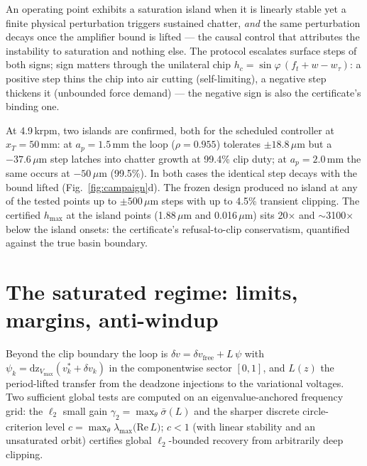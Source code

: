 \documentclass[preprint,12pt]{elsarticle}
\newcommand{\dz}{\mathrm{dz}}
\newcommand{\um}{\,\ensuremath{\mu\mathrm{m}}}
\begin{document}
An operating point exhibits a saturation island when it is linearly
stable yet a finite physical perturbation triggers sustained chatter,
\emph{and} the same perturbation decays once the amplifier bound is
lifted --- the causal control that attributes the instability to
saturation and nothing else. The protocol escalates surface steps of
both signs; sign matters through the unilateral chip
$h_c=\sin\varphi\,(f_t+w-w_\tau)$: a positive step thins the chip
into air cutting (self-limiting), a negative step thickens it
(unbounded force demand) --- the negative sign is also the
certificate's binding one.

At 4.9\,krpm, two islands are confirmed, both for the scheduled
controller at $x_T=50$\,mm: at $a_p=1.5$\,mm the loop
($\rho=0.955$) tolerates $\pm18.8\um$ but a $-37.6\um$ step latches
into chatter growth at 99.4\% clip duty; at $a_p=2.0$\,mm the same
occurs at $-50\um$ (99.5\%). In both cases the identical step decays
with the bound lifted (Fig.~\ref{fig:campaign}d). The frozen design
produced no island at any of the tested points up to $\pm500\um$
steps with up to 4.5\% transient clipping. The certified $h_{\max}$
at the island points (1.88\um{} and 0.016\um) sits 20$\times$ and
$\sim$3100$\times$ below the island onsets: the certificate's
refusal-to-clip conservatism, quantified against the true basin
boundary.

\section{The saturated regime: limits, margins, anti-windup}
\label{sec:satregime}

Beyond the clip boundary the loop is
$\delta v = \delta v_{\mathrm{free}} + L\,\psi$ with
$\psi_k=\dz_{V_{\max}}(v^*_k+\delta v_k)$ in the componentwise sector
$[0,1]$, and $L(z)$ the period-lifted transfer from the deadzone
injections to the variational voltages. Two sufficient global tests
are computed on an eigenvalue-anchored frequency grid: the
$\ell_2$ small gain $\gamma_2=\max_\theta\bar\sigma(L)$ and the
sharper discrete circle-criterion level
$c=\max_\theta\lambda_{\max}\!\bigl(\mathrm{Re}\,L\bigr)$; $c<1$
(with linear stability and an unsaturated orbit) certifies global
$\ell_2$-bounded recovery from arbitrarily deep clipping.
\end{document}
